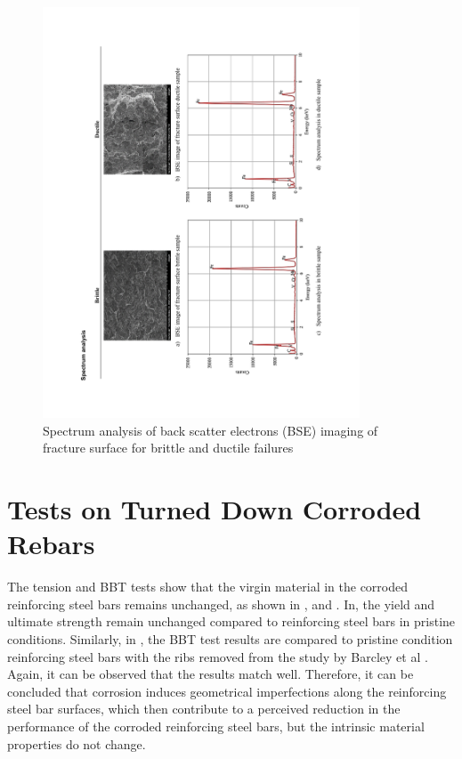 \begin{figure}[htbp]
	\centering
	\includegraphics[width=0.84\textwidth]{VAC Thesis 2.0/Chapter-4/figs/BBT_SpectrumAnalysis.pdf}
	\caption{Spectrum analysis of back scatter electrons (BSE) imaging of fracture surface for brittle and ductile failures}
	\label{fig:SpectrumAnalysis}
\end{figure}

\section{Tests on Turned Down Corroded Rebars}
The tension and BBT tests show that the virgin material in the corroded reinforcing steel bars remains unchanged, as shown in , and . In, the yield and ultimate strength remain unchanged compared to reinforcing steel bars in pristine conditions. Similarly, in , the BBT test results are compared to pristine condition reinforcing steel bars with the ribs removed from the study by Barcley et al \cite{Barcley2018}. Again, it can be observed that the results match well. Therefore, it can be concluded that corrosion induces geometrical imperfections along the reinforcing steel bar surfaces, which then contribute to a perceived reduction in the performance of the corroded reinforcing steel bars, but the intrinsic material properties do not change. 

